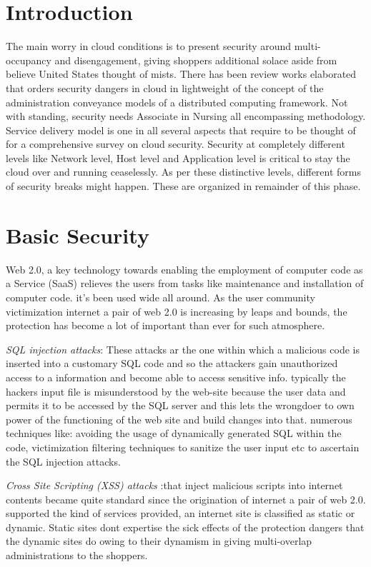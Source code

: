 \section{Introduction}
The main worry in cloud conditions is to present security around multi-occupancy and
disengagement, giving shoppers additional solace aside from believe United States thought of mists. There has been review works elaborated that orders security dangers in cloud in lightweight of the concept of the administration conveyance models of a distributed computing framework. Not with standing, security needs Associate in Nursing all encompassing methodology. Service delivery model is one in all several aspects that require to be thought of for a comprehensive survey on cloud security. Security at completely different levels like Network level, Host level and Application level is critical to stay the cloud over and running ceaselessly. As per these distinctive levels, different forms of security breaks might happen. These are organized in remainder of
this phase. 
\section{Basic Security}
Web 2.0, a key technology towards enabling the employment of computer code as a
Service (SaaS) relieves the users from tasks like maintenance and installation of computer code. it's been used wide all around. As the user community victimization internet a pair of web 2.0 is increasing by leaps and bounds, the protection has become a lot of important than ever for such atmosphere.

\textit{SQL injection attacks}: These attacks ar the one within which a malicious code is inserted into a customary SQL code and so the attackers gain unauthorized access to a information and become able to access sensitive info. typically the hackers input file is misunderstood by the web-site because the user data and permits it to be accessed by the SQL server and this lets the wrongdoer to
own power of the functioning of the web site and build changes into that. numerous techniques like: avoiding the usage of dynamically generated SQL within the code, victimization filtering techniques to sanitize the user input etc to ascertain
the SQL injection attacks.

\textit{Cross Site Scripting (XSS) attacks} :that inject malicious scripts into internet contents became quite standard since the origination of internet a pair of web 2.0. supported the kind of services provided, an internet site is
classified as static or dynamic. Static sites dont expertise the sick effects of the
protection dangers that the dynamic sites do owing to their dynamism in giving multi-overlap administrations to the shoppers.


